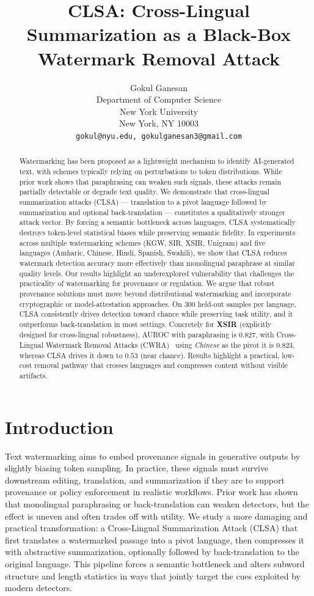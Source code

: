 \documentclass{article}
\title{CLSA: Cross-Lingual Summarization as a Black-Box Watermark Removal Attack}
\author{Gokul Ganesan \\
  Department of Computer Science\\
  New York University\\
  New York, NY 10003 \\
  \texttt{gokul@nyu.edu, gokulganesan3@gmail.com} \\
}
\begin{document}
\maketitle

\begin{abstract}
Watermarking has been proposed as a lightweight mechanism to identify AI-generated text, with schemes typically relying on perturbations to token distributions. While prior work shows that paraphrasing can weaken such signals, these attacks remain partially detectable or degrade text quality. We demonstrate that cross-lingual summarization attacks (CLSA) — translation to a pivot language followed by summarization and optional back-translation — constitutes a qualitatively stronger attack vector. By forcing a semantic bottleneck across languages, CLSA systematically destroys token-level statistical biases while preserving semantic fidelity. In experiments across multiple watermarking schemes (KGW, SIR, XSIR, Unigram) and five languages (Amharic, Chinese, Hindi, Spanish, Swahili), we show that CLSA reduces watermark detection accuracy more effectively than monolingual paraphrase at similar quality levels. Our results highlight an underexplored vulnerability that challenges the practicality of watermarking for provenance or regulation. We argue that robust provenance solutions must move beyond distributional watermarking and incorporate cryptographic or model-attestation approaches. On 300 held-out samples per language, CLSA consistently drives detection toward chance while preserving task utility, and it outperforms back-translation in most settings. Concretely for \textbf{XSIR} (explicitly designed for cross-lingual robustness), AUROC with paraphrasing is $0.827$, with Cross-Lingual Watermark Removal Attacks (CWRA)~\citep{He2024cwra} using \emph{Chinese} as the pivot it is $0.823$, whereas CLSA drives it down to $0.53$ (near chance). Results highlight a practical, low-cost removal pathway that crosses languages and compresses content without visible artifacts.
\end{abstract}

\section{Introduction}

Text watermarking aims to embed provenance signals in generative outputs by slightly biasing token sampling. In practice, these signals must survive downstream editing, translation, and summarization if they are to support provenance or policy enforcement in realistic workflows. Prior work has shown that monolingual paraphrasing or back-translation can weaken detectors, but the effect is uneven and often trades off with utility. We study a more damaging and practical transformation: a Cross-Lingual Summarization Attack (CLSA) that first translates a watermarked passage into a pivot language, then compresses it with abstractive summarization, optionally followed by back-translation to the original language. This pipeline forces a semantic bottleneck and alters subword structure and length statistics in ways that jointly target the cues exploited by modern detectors.
\end{document}
